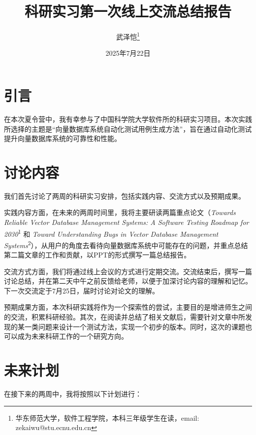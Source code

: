 \documentclass[UTF8]{ctexart}
\title{\heiti 科研实习第一次线上交流总结报告}
\author{武泽恺\footnote{华东师范大学，软件工程学院，本科三年级学生在读，email: zekaiwu@stu.ecnu.edu.cn}}
\date{2025年7月22日}
\begin{document}
\maketitle

\section{引言}
在本次夏令营中，我有幸参与了中国科学院大学软件所的科研实习项目。本次实践所选择的主题是“向量数据库系统自动化测试用例生成方法”，旨在通过自动化测试提升向量数据库系统的可靠性和性能。

\section{讨论内容}

我们首先讨论了两周的科研实习安排，包括实践内容、交流方式以及预期成果。

实践内容方面，在未来的两周时间里，我将主要研读两篇重点论文（\textit{Towards Reliable Vector Database Management Systems: A Software Testing Roadmap for 2030}\textsuperscript{1} 和 \textit{Toward Understanding Bugs in Vector Database Management Systems}\textsuperscript{2}），从用户的角度去看待向量数据库系统中可能存在的问题，并重点总结第二篇文章的工作和贡献，以PPT的形式撰写一篇总结报告。

交流方式方面，我们将通过线上会议的方式进行定期交流。交流结束后，撰写一篇讨论总结，并在第二天中午之前反馈给老师，以便于加深讨论内容的理解和记忆。下一次交流定于7月25日，届时讨论对论文的理解。

预期成果方面，本次科研实践将作为一个探索性的尝试，主要目的是增进师生之间的交流，积累科研经验。其次，在阅读并总结了相关文献后，需要针对文章中所发现的某一类问题来设计一个测试方法，实现一个初步的版本。同时，这次的课题也可以成为未来科研工作的一个研究方向。

\section{未来计划}

在接下来的两周中，我将按照以下计划进行：
\end{document}
